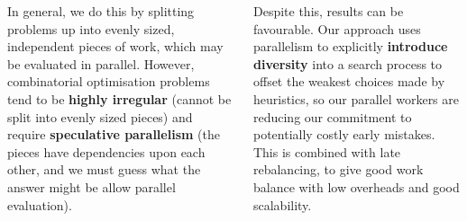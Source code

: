 \documentclass[20pt,a1paper,landscape]{tikzposter}
\begin{document}
\begin{columns}
{    \medskip

    In general, we do this by splitting problems up into evenly sized, independent pieces of work,
    which may be evaluated in parallel. However, combinatorial optimisation
    problems tend to be \textbf{highly irregular} (cannot be split into evenly sized pieces) and
    require \textbf{speculative parallelism} (the pieces have dependencies upon each other, and we
    must guess what the answer might be allow parallel evaluation).

    \medskip

    Despite this, results can be favourable. Our approach uses parallelism to explicitly
    \textbf{introduce diversity} into a search process to offset the weakest choices made by
    heuristics, so our parallel workers are reducing our commitment to potentially costly early
    mistakes. This is combined with late rebalancing, to give good work balance with low overheads
    and good scalability.
}


\end{columns}
\end{document}
